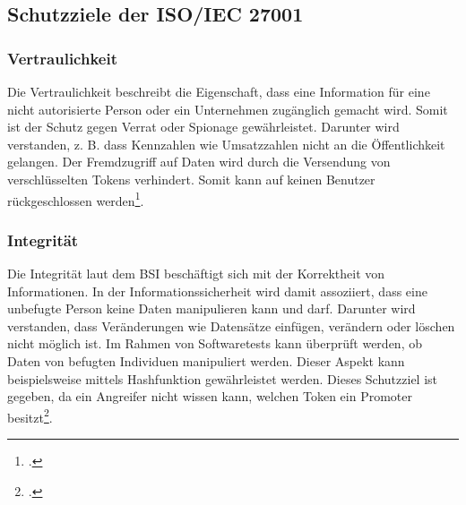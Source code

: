 \subsection{Schutzziele der ISO/IEC 27001}
\subsubsection{Vertraulichkeit}
Die Vertraulichkeit beschreibt die Eigenschaft, dass eine Information für eine nicht autorisierte Person oder ein Unternehmen zugänglich gemacht wird. Somit ist der Schutz gegen Verrat oder Spionage gewährleistet. Darunter wird verstanden, z. B. dass Kennzahlen wie Umsatzzahlen nicht an die Öffentlichkeit gelangen. 
Der Fremdzugriff auf Daten wird durch die Versendung von verschlüsselten Tokens verhindert. Somit kann auf keinen Benutzer rückgeschlossen werden\footcite{Lehrunterlagen-HTL-cloud}.


\subsubsection{Integrität}
Die Integrität laut dem BSI beschäftigt sich mit der Korrektheit von Informationen. In der Informationssicherheit wird damit assoziiert, dass eine unbefugte Person keine Daten manipulieren kann und darf. Darunter wird verstanden, dass Veränderungen wie Datensätze einfügen, verändern oder löschen nicht möglich ist.
Im Rahmen von Softwaretests kann überprüft werden, ob Daten von befugten Individuen manipuliert werden. Dieser Aspekt kann beispielsweise mittels Hashfunktion gewährleistet werden.
Dieses Schutzziel ist gegeben, da ein Angreifer nicht wissen kann, welchen Token ein Promoter besitzt\footcite{Lehrunterlagen-HTL-cloud}.

